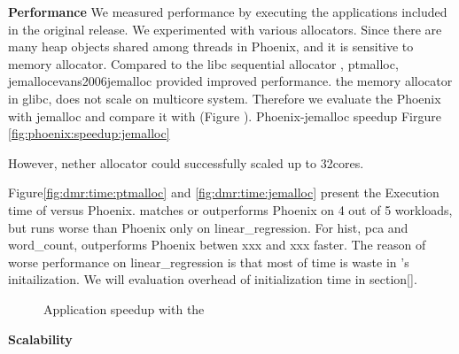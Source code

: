{\bf Performance}
We measured \myds performance by executing the applications
included in the original release. 
We experimented with various allocators.
Since there are many heap objects shared among threads
in Phoenix, and it is sensitive to memory allocator.
Compared to the libc sequential allocator ,  
ptmalloc\cite{gloger1997ptmalloc},
jemalloc{evans2006jemalloc} provided improved performance. 
the memory allocator in glibc, does not scale on multicore system. 
Therefore we evaluate the Phoenix with jemalloc and
compare it  with \myds(Figure \label{fig:dmr:time:jemalloc}).
Phoenix-jemalloc speedup Firgure \ref{fig:phoenix:speedup:jemalloc}

However, nether allocator could successfully scaled up to 32cores.

Figure\ref{fig:dmr:time:ptmalloc} and \ref{fig:dmr:time:jemalloc}
present the Execution time of \myds versus Phoenix.
\myds matches or outperforms Phoenix on 4 out of 5 workloads,
but runs worse than Phoenix only on linear\_regression.
For hist, pca and word\_count, 
\myds outperforms Phoenix betwen xxx and xxx faster.
The reason of worse performance on linear\_regression 
is that most of time is waste in \myds's initailization.
We will evaluation overhead of initialization time in section\ref{}.



\begin{figure}[htpb]
\centering
  \caption{ Application speedup with the \myds}
   \label{fig:scalability}
\end{figure}
{\bf Scalability}


